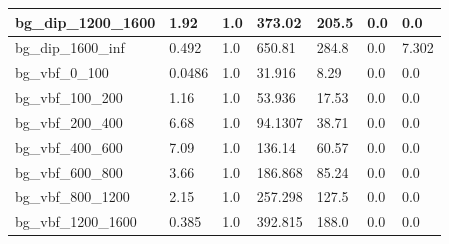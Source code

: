 \documentclass[a4paper, 10pt]{article}
\begin{document}
\begin{table}[H]
\begin{center}
\begin{tabular}{|m{23.0mm}|m{23.0mm}|m{18.0mm}|m{19.0mm}|m{19.0mm}|m{19.0mm}|m{19.0mm}|}
      \hline
      {\cellcolor{white}         bg\_dip\_1200\_1600}& {\cellcolor{white}         1.92}& {\cellcolor{white}         1.0}& {\cellcolor{white}         373.02}& {\cellcolor{white}         205.5}& {\cellcolor{green}         0.0}& {\cellcolor{green}         0.0}\\
      \hline
      {\cellcolor{white}         bg\_dip\_1600\_inf}& {\cellcolor{white}         0.492}& {\cellcolor{white}         1.0}& {\cellcolor{white}         650.81}& {\cellcolor{white}         284.8}& {\cellcolor{orange}         0.0}& {\cellcolor{orange}         7.302}\\
      \hline
      {\cellcolor{white}         bg\_vbf\_0\_100}& {\cellcolor{white}         0.0486}& {\cellcolor{white}         1.0}& {\cellcolor{white}         31.916}& {\cellcolor{white}         8.29}& {\cellcolor{green}         0.0}& {\cellcolor{green}         0.0}\\
      \hline
      {\cellcolor{white}         bg\_vbf\_100\_200}& {\cellcolor{white}         1.16}& {\cellcolor{white}         1.0}& {\cellcolor{white}         53.936}& {\cellcolor{white}         17.53}& {\cellcolor{green}         0.0}& {\cellcolor{green}         0.0}\\
      \hline
      {\cellcolor{white}         bg\_vbf\_200\_400}& {\cellcolor{white}         6.68}& {\cellcolor{white}         1.0}& {\cellcolor{white}         94.1307}& {\cellcolor{white}         38.71}& {\cellcolor{green}         0.0}& {\cellcolor{green}         0.0}\\
      \hline
      {\cellcolor{white}         bg\_vbf\_400\_600}& {\cellcolor{white}         7.09}& {\cellcolor{white}         1.0}& {\cellcolor{white}         136.14}& {\cellcolor{white}         60.57}& {\cellcolor{green}         0.0}& {\cellcolor{green}         0.0}\\
      \hline
      {\cellcolor{white}         bg\_vbf\_600\_800}& {\cellcolor{white}         3.66}& {\cellcolor{white}         1.0}& {\cellcolor{white}         186.868}& {\cellcolor{white}         85.24}& {\cellcolor{green}         0.0}& {\cellcolor{green}         0.0}\\
      \hline
      {\cellcolor{white}         bg\_vbf\_800\_1200}& {\cellcolor{white}         2.15}& {\cellcolor{white}         1.0}& {\cellcolor{white}         257.298}& {\cellcolor{white}         127.5}& {\cellcolor{green}         0.0}& {\cellcolor{green}         0.0}\\
      \hline
      {\cellcolor{white}         bg\_vbf\_1200\_1600}& {\cellcolor{white}         0.385}& {\cellcolor{white}         1.0}& {\cellcolor{white}         392.815}& {\cellcolor{white}         188.0}& {\cellcolor{green}         0.0}& {\cellcolor{green}         0.0}\\

\end{tabular}
\end{center}
\end{table}
\end{document}
